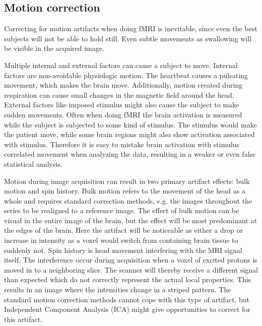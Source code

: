 \subsection{Motion correction}

Correcting for motion artifacts when doing fMRI is inevitable, since even the best subjects will not be able to hold still. Even subtle movements as swallowing will be visible in the acquired image. \cite{Poldrack2011} 

Multiple internal and external factors can cause a subject to move. Internal factors are non-avoidable physiologic motion. The heartbeat causes a pulsating movement, which makes the brain move. Additionally, motion created during respiration can cause small changes in the magnetic field around the head. External factors like imposed stimulus might also cause the subject to make sudden movements. Often when doing fMRI the brain activation is measured while the subject is subjected to some kind of stimulus. The stimulus would make the patient move, while some brain regions might also show activation associated with stimulus. Therefore it is easy to mistake brain activation with stimulus correlated movement when analyzing the data, resulting in a weaker or even false statistical analysis. \cite{Poldrack2011} 

Motion during image acquisition can result in two primary artifact effects: bulk motion and spin history. Bulk motion refers to the movement of the head as a whole and requires standard correction methods, e.g. the images throughout the series to be realigned to a reference image. The effect of bulk motion can be visual in the entire image of the brain, but the effect will be most predominant at the edges of the brain. Here the artifact will be noticeable as either a drop or increase in intensity as a voxel would switch from containing brain tissue to suddenly not.  
Spin history is head movement interfering with the MRI signal itself. The interference occur during acquisition when a voxel of excited protons is moved in to a neighboring slice. The scanner will thereby receive a different signal than expected which do not correctly represent the actual local properties. This results in an image where the intensities change in a striped pattern. The standard motion correction methods cannot cope with this type of artifact, but Independent Component Analysis (ICA) might give opportunities to correct for this artifact. \cite{Poldrack2011} 

